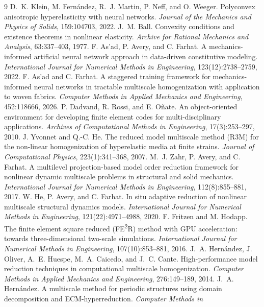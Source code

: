 \documentclass[10pt,a4paper]{article}
\begin{document}
\begin{thebibliography}{9}
D.~K. Klein, M. Fern\'andez, R.~J. Martin, P. Neff, and O. Weeger.
Polyconvex anisotropic hyperelasticity with neural networks.
\emph{Journal of the Mechanics and Physics of Solids}, 159:104703, 2022.
J.~M. Ball. Convexity conditions and existence theorems in nonlinear
elasticity. \emph{Archive for Rational Mechanics and Analysis}, 63:337--403,
1977.
F. As'ad, P. Avery, and C. Farhat. A mechanics-informed artificial neural
network approach in data-driven constitutive modeling.
\emph{International Journal for Numerical Methods in Engineering},
123(12):2738--2759, 2022.
F. As'ad and C. Farhat. A staggered training framework for
mechanics-informed neural networks in tractable multiscale
homogenization with application to woven fabrics. \emph{Computer
Methods in Applied Mechanics and Engineering}, 452:118666, 2026.
P. Dadvand, R. Rossi, and E. O\~nate. An object-oriented environment for
developing finite element codes for multi-disciplinary applications.
\emph{Archives of Computational Methods in Engineering}, 17(3):253--297,
2010.
J. Yvonnet and Q.-C. He. The reduced model multiscale method (R3M) for
the non-linear homogenization of hyperelastic media at finite strains.
\emph{Journal of Computational Physics}, 223(1):341--368, 2007.
M.~J. Zahr, P. Avery, and C. Farhat. A multilevel projection-based
model order reduction framework for nonlinear dynamic multiscale
problems in structural and solid mechanics. \emph{International
Journal for Numerical Methods in Engineering}, 112(8):855--881, 2017.
W. He, P. Avery, and C. Farhat. In situ adaptive reduction of nonlinear
multiscale structural dynamics models. \emph{International Journal for
Numerical Methods in Engineering}, 121(22):4971--4988, 2020.
F. Fritzen and M. Hodapp. The finite element square reduced
(FE\textsuperscript{2}R) method with GPU acceleration: towards
three-dimensional two-scale simulations. \emph{International Journal
for Numerical Methods in Engineering}, 107(10):853--881, 2016.
J.~A. Hern\'andez, J. Oliver, A.~E. Huespe, M.~A. Caicedo, and J.~C.
Cante. High-performance model reduction techniques in computational
multiscale homogenization. \emph{Computer Methods in Applied Mechanics
and Engineering}, 276:149--189, 2014.
J.~A. Hern\'andez. A multiscale method for periodic structures using
domain decomposition and ECM-hyperreduction. \emph{Computer Methods in
}
\end{thebibliography}
\end{document}
